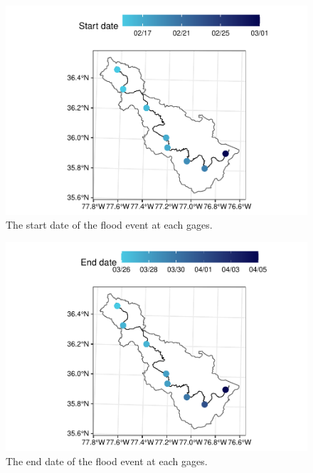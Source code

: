 \documentclass[12pt,]{article}
\begin{document}
\begin{figure}
\centering
\includegraphics{Zeng_WDA_Project_files/figure-latex/Figure 3-1.pdf}
\caption{The start date of the flood event at each gages.}
\end{figure}

\begin{figure}
\centering
\includegraphics{Zeng_WDA_Project_files/figure-latex/Figure 4-1.pdf}
\caption{The end date of the flood event at each gages.}
\end{figure}
\end{document}
